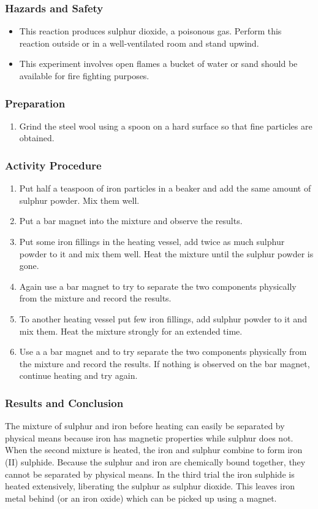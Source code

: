 \subsubsection*{Hazards and Safety}
\begin{itemize}
\item{This reaction produces sulphur dioxide, a poisonous gas. Perform this reaction outside or in a well-ventilated room and stand upwind.}
\item{This experiment involves open flames a bucket of water or sand should be available for fire fighting purposes.}
\end{itemize}

\subsubsection*{Preparation}
\begin{enumerate}
\item{Grind the steel wool using a spoon on a hard surface so that fine particles are obtained.}
\end{enumerate}

\subsubsection*{Activity Procedure}
\begin{enumerate}
\item{Put half a teaspoon of iron particles in a beaker and add the same amount of sulphur powder. Mix them well.}
\item{Put a bar magnet into the mixture and observe the results.}
\item{Put some iron fillings in the heating vessel, add twice as much sulphur powder to it and mix them well. Heat the mixture until the sulphur powder is gone.}
\item{Again use a bar magnet to try to separate the two components physically from the mixture and record the results.}
\item{To another heating vessel put few iron fillings, add sulphur powder to it and mix them. Heat the mixture strongly for an extended time.}
\item{Use a a bar magnet and to try separate the two components physically from the mixture and record the results. If nothing is observed on the bar magnet, continue heating and try again.}
\end{enumerate}

\subsubsection*{Results and Conclusion}
The mixture of sulphur and iron before heating can easily be separated by physical means because iron has magnetic properties while sulphur does not. When the second mixture is heated, the iron and sulphur combine to form iron (II) sulphide. Because the sulphur and iron are chemically bound together, they cannot be separated by physical means. In the third trial the iron sulphide is heated extensively, liberating the sulphur as sulphur dioxide. This leaves iron metal behind (or an iron oxide) which can be picked up using a magnet.

